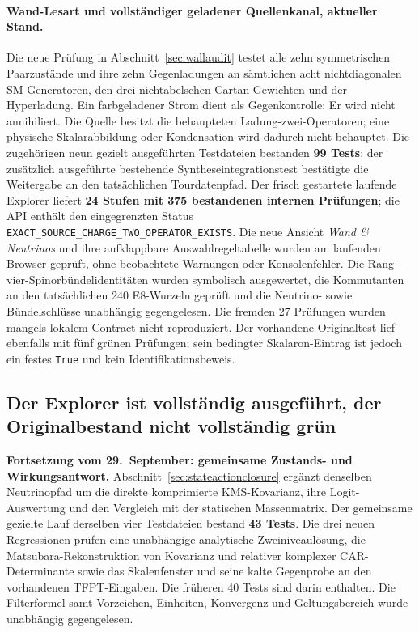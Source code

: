\paragraph{Wand-Lesart und vollständiger geladener Quellenkanal, aktueller Stand.}
Die neue Prüfung in Abschnitt~\ref{sec:wallaudit} testet alle zehn symmetrischen
Paarzustände und ihre zehn Gegenladungen an sämtlichen acht nichtdiagonalen
SM-Generatoren, den drei nichtabelschen Cartan-Gewichten und der Hyperladung.
Ein farbgeladener Strom dient als Gegenkontrolle: Er wird nicht annihiliert.
Die Quelle besitzt die behaupteten Ladung-zwei-Operatoren; eine physische
Skalarabbildung oder Kondensation wird dadurch nicht behauptet.
Die zugehörigen neun gezielt ausgeführten Testdateien bestanden
\textbf{99 Tests}; der zusätzlich ausgeführte bestehende Syntheseintegrationstest
bestätigte die Weitergabe an den tatsächlichen Tourdatenpfad.
Der frisch gestartete laufende Explorer liefert \textbf{24 Stufen mit 375 bestandenen internen Prüfungen}; die API enthält den eingegrenzten Status \texttt{EXACT\_SOURCE\_CHARGE\_TWO\_OPERATOR\_EXISTS}. Die neue Ansicht \emph{Wand \& Neutrinos} und ihre aufklappbare Auswahlregeltabelle wurden am laufenden Browser geprüft, ohne beobachtete Warnungen oder Konsolenfehler.
Die Rang-vier-Spinorbündelidentitäten wurden symbolisch ausgewertet,
die Kommutanten an den tatsächlichen 240 E8-Wurzeln geprüft und die
Neutrino- sowie Bündelschlüsse unabhängig gegengelesen. Die fremden
27 Prüfungen wurden mangels lokalem Contract nicht reproduziert.
Der vorhandene Originaltest  lief ebenfalls
mit fünf grünen Prüfungen; sein bedingter Skalaron-Eintrag ist jedoch ein
festes \texttt{True} und kein Identifikationsbeweis.

\subsection{Der Explorer ist vollständig ausgeführt, der Originalbestand nicht vollständig grün}

\textbf{Fortsetzung vom 29.~September: gemeinsame Zustands- und Wirkungsantwort.}
Abschnitt~\ref{sec:stateactionclosure} ergänzt denselben Neutrinopfad
um die direkte komprimierte KMS-Kovarianz, ihre Logit-Auswertung
und den Vergleich mit der statischen Massenmatrix.
Der gemeinsame gezielte Lauf derselben vier Testdateien bestand
\textbf{43 Tests}. Die drei neuen Regressionen prüfen eine unabhängige
analytische Zweiniveaulösung, die Matsubara-Rekonstruktion von Kovarianz
und relativer komplexer CAR-Determinante sowie das Skalenfenster und seine
kalte Gegenprobe an den vorhandenen TFPT-Eingaben.
Die früheren 40 Tests sind darin enthalten.
Die Filterformel samt Vorzeichen, Einheiten, Konvergenz und Geltungsbereich
wurde unabhängig gegengelesen.

